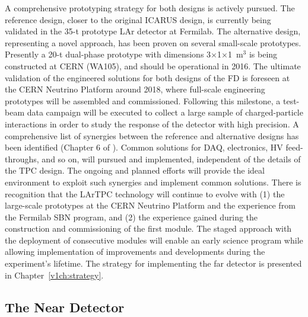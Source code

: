 A  comprehensive prototyping strategy for both designs is actively pursued.
The reference design, closer to the original ICARUS design, is currently being validated in the 35-t prototype 
LAr detector at Fermilab.  The alternative design, representing a novel approach, has been proven on several
small-scale prototypes. Presently
a 20-t dual-phase prototype with dimensions 3$\times$1$\times$1~m$^3$ is being constructed at CERN (WA105),  
and should be operational in 2016. 
The ultimate validation of the engineered solutions for both designs of the FD is foreseen at 
the CERN Neutrino Platform around 2018,  where full-scale engineering prototypes will be 
assembled and commissioned. Following this milestone, a test-beam data 
campaign will be executed %
to collect a large sample of charged-particle interactions
in order to study the response of the detector with high precision.
A comprehensive list of synergies between the reference and alternative designs has been identified (Chapter 6 of \voldune). Common solutions for DAQ, electronics, HV feed-throughs, and so on, will pursued and implemented, independent of the details of the TPC design. The ongoing and planned efforts %
will
provide the ideal environment to exploit such synergies and implement common solutions.
There is recognition that the LArTPC technology will continue to evolve with (1) the large-scale prototypes at the CERN Neutrino Platform and the experience from the Fermilab SBN program, and (2) the experience gained during the construction and commissioning of the first  module. 
The staged approach with the deployment of consecutive modules will
enable an early science program while allowing implementation of improvements and developments  during the experiment's lifetime.
The strategy for implementing
the far detector is presented in Chapter~\ref{v1ch:strategy}.

\subsection{The Near Detector} %


